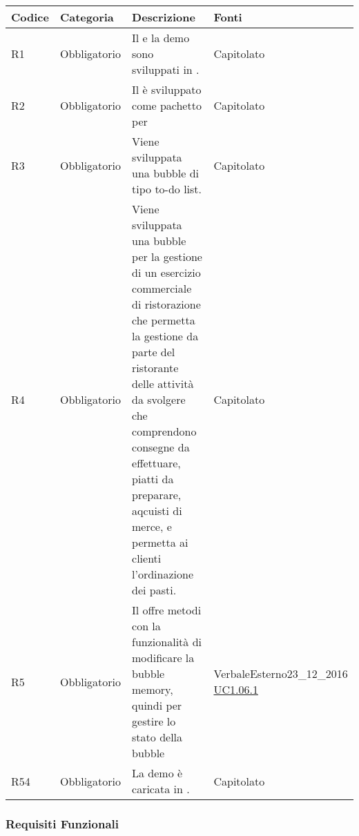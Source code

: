 \begin{longtable}{|P{1.5cm}|P{3cm}|P{6cm}|P{2.5cm}|}
	\hline \textbf{Codice} & \textbf{Categoria} & \textbf{Descrizione} & \textbf{Fonti} \\
	\hline R1 & Obbligatorio & Il  e la demo sono sviluppati in . & Capitolato \\
	\hline R2 & Obbligatorio & Il  è sviluppato come pachetto per  & Capitolato \\
	\hline R3 & Obbligatorio & Viene sviluppata una bubble di tipo to-do list. & Capitolato \\
	\hline R4 & Obbligatorio & Viene sviluppata una bubble per la gestione di un esercizio commerciale di ristorazione che permetta la gestione da parte del ristorante delle attività da svolgere che comprendono consegne da effettuare,  piatti da preparare, aqcuisti di merce, e permetta ai clienti l’ordinazione dei pasti. & Capitolato \\
	\hline R5 & Obbligatorio & Il  offre metodi con la funzionalità di modificare la bubble memory, quindi per gestire lo stato della bubble & VerbaleEsterno23\_12\_2016 \linebreak \hyperref[UC1.06.1]{UC1.06.1}  \\
	\hline R54 & Obbligatorio & La demo è caricata in . & Capitolato \\
	\hline
\end{longtable}

\subsubsection{Requisiti Funzionali}

